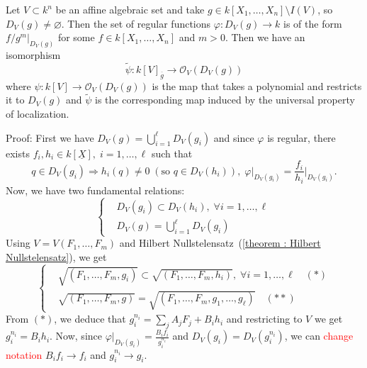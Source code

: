 \begin{dang}
    \begin{lemma}\label{lemma: regular functions on principal open sets}
        Let $V\subset k^n$ be an affine algebraic set and take $g\in k[X_1,\dots, X_n]\setminus I(V)$, 
        so $D_V(g)\neq\varnothing$. Then the set of regular functions 
        $\varphi: D_V(g)\to k$ is of the form $f/g^m|_{D_V(g)}$ for some $f\in k[X_1,\dots, X_n]$ and $m>0$. Then we have  
        an isomorphism
        \begin{equation}
            \widetilde{\psi}:k[V]_{\overline{g}}\rightarrow \mathcal{O}_V(D_V(g))
        \end{equation}
        where $\psi: k[V]\rightarrow \mathcal{O}_V(D_V(g))$ is the map that takes a polynomial 
        and restricts it to $D_V(g)$ and $\widetilde{\psi}$ is the corresponding map induced by the universal
        property of localization. 
    \end{lemma}
\end{dang}
Proof: First we have $D_V(g)=\bigcup_{i=1}^\ell D_V(g_i)$ and since $\varphi$ is regular, there exists 
$f_i, h_i\in k[\underline{X}],\;i=1,\dots,\ell$ such that 
\begin{equation}
    q\in D_V(g_i)\Rightarrow h_i(q)\neq 0\;(\text{so }q\in D_V(h_i)),\;\varphi\big|_{D_V(g_i)}=\frac{f_i}{h_i}\bigg|_{D_V(g_i)}.
\end{equation}
Now, we have two fundamental relations:
\begin{equation}
    \left\{\begin{aligned}
        &D_V(g_i)\subset D_V(h_i),\;\forall i=1,\dots,\ell\\
        &D_V(g)=\bigcup_{i=1}^\ell D_V(g_i)
    \end{aligned}\right.
\end{equation}
Using $V=V(F_1,\dots, F_m)$ and Hilbert Nullstelensatz~(\ref{theorem : Hilbert Nullstelensatz}), we get 
\begin{equation}
    \left\{\begin{aligned}
        &\sqrt{(F_1,\dots,F_m,g_i)}\subset \sqrt{(F_1,\dots,F_m,h_i)},\;\forall i=1,\dots,\ell\quad (*)\\
        &\sqrt{(F_1,\dots,F_m,g)}=\sqrt{(F_1,\dots,F_m,g_1,\dots,g_\ell)}\quad(**)
    \end{aligned}\right.
\end{equation}
From $(*)$, we deduce that $g_i^{n_i}=\sum_j A_jF_j+B_ih_i$ and restricting to $V$ we get 
$g_i^{n_i}=B_ih_i$. Now, since $\varphi\big|_{D_V(g_i)}=\frac{B_i f_i}{g_i^{n_i}}$ and 
$D_V(g_i)=D_V(g_i^{n_i})$, we can \textcolor{red}{change notation} $B_i f_i\to f_i$ and $g_i^{n_i}\to g_i$.\par 

